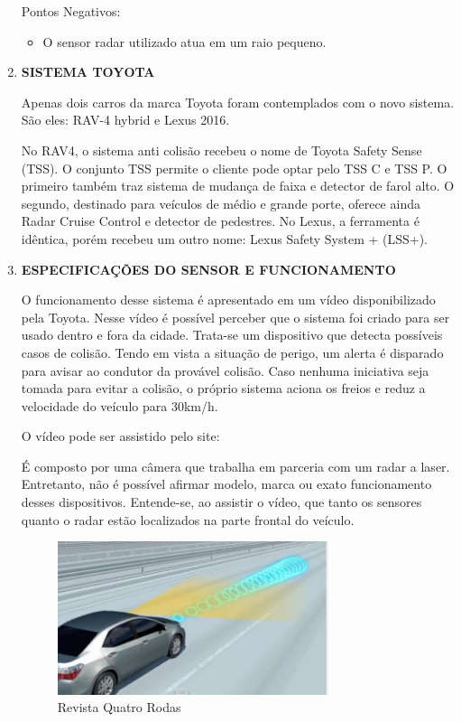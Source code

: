 \begin{enumerate}
  Pontos Negativos:
 \begin{itemize}
   \item O sensor radar utilizado atua em um raio pequeno.
 \end{itemize}

 \item \textbf{SISTEMA TOYOTA}

 Apenas dois carros da marca Toyota foram contemplados com o novo sistema.
 São eles: RAV-4 hybrid e Lexus 2016. \cite{3comper}

 No RAV4, o sistema anti colisão recebeu o nome de Toyota Safety Sense
 (TSS). O conjunto TSS permite o cliente pode optar pelo TSS C e TSS P. O
 primeiro também traz sistema de mudança de faixa e detector de farol alto.
  O segundo, destinado para veículos de médio e grande porte, oferece ainda
  Radar Cruise Control e detector de pedestres. No Lexus, a ferramenta é
  idêntica, porém recebeu um outro nome: Lexus Safety System + (LSS+).

  \item \textbf{ESPECIFICAÇÕES DO SENSOR E FUNCIONAMENTO}

  O funcionamento desse sistema é apresentado em um vídeo disponibilizado pela
  Toyota. Nesse vídeo é possível perceber que o sistema foi criado para ser usado
  dentro e fora da cidade. Trata-se um dispositivo que detecta possíveis casos de
  colisão. Tendo em vista a situação de perigo, um alerta é disparado para avisar
  ao condutor da provável colisão. Caso nenhuma iniciativa seja tomada para evitar
  a colisão, o próprio sistema aciona os freios e reduz a velocidade do veículo para 30km/h.

  O vídeo pode ser assistido pelo site: \cite{4comper}

  É composto por uma câmera que trabalha em parceria com um radar a laser.
  Entretanto, não é possível afirmar modelo, marca ou exato funcionamento
  desses dispositivos. Entende-se, ao assistir o vídeo, que tanto os sensores
  quanto o radar estão localizados na parte frontal do veículo.


  \begin{figure}[h]
    \centering
    \includegraphics[width=300px, scale=1]{figuras/sinal_componentes}
    \caption{Revista Quatro Rodas}
  \label{fig:sinal_componentes}
  \end{figure}


\end{enumerate}
